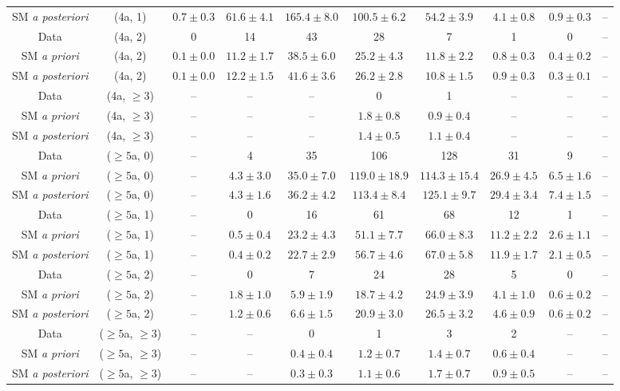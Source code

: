\begin{table}[h!]
{\begin{tabular}{cccccccccc}
	SM \textit{a posteriori} & (4a, 1) & $0.7\pm 0.3$ & $61.6\pm 4.1$ & $165.4\pm 8.0$ & $100.5\pm 6.2$ & $54.2\pm 3.9$ & $4.1\pm 0.8$ & $0.9\pm 0.3$ & -- \\[0.5ex] 
	Data & (4a, 2) & 0 & 14 & 43 & 28 & 7 & 1 & 0 & -- \\[0.5ex] 
	SM \textit{a priori} & (4a, 2) & $0.1\pm 0.0$ & $11.2\pm 1.7$ & $38.5\pm 6.0$ & $25.2\pm 4.3$ & $11.8\pm 2.2$ & $0.8\pm 0.3$ & $0.4\pm 0.2$ & -- \\[0.5ex] 
	SM \textit{a posteriori} & (4a, 2) & $0.1\pm 0.0$ & $12.2\pm 1.5$ & $41.6\pm 3.6$ & $26.2\pm 2.8$ & $10.8\pm 1.5$ & $0.9\pm 0.3$ & $0.3\pm 0.1$ & -- \\[0.5ex] 
	Data & (4a, $\ge3$) & -- & -- & -- & 0 & 1 & -- & -- & -- \\[0.5ex] 
	SM \textit{a priori} & (4a, $\ge3$) & -- & -- & -- & $1.8\pm 0.8$ & $0.9\pm 0.4$ & -- & -- & -- \\[0.5ex] 
	SM \textit{a posteriori} & (4a, $\ge3$) & -- & -- & -- & $1.4\pm 0.5$ & $1.1\pm 0.4$ & -- & -- & -- \\[0.5ex] 
	Data & ($\ge5$a, 0) & -- & 4 & 35 & 106 & 128 & 31 & 9 & -- \\[0.5ex] 
	SM \textit{a priori} & ($\ge5$a, 0) & -- & $4.3\pm 3.0$ & $35.0\pm 7.0$ & $119.0\pm 18.9$ & $114.3\pm 15.4$ & $26.9\pm 4.5$ & $6.5\pm 1.6$ & -- \\[0.5ex] 
	SM \textit{a posteriori} & ($\ge5$a, 0) & -- & $4.3\pm 1.6$ & $36.2\pm 4.2$ & $113.4\pm 8.4$ & $125.1\pm 9.7$ & $29.4\pm 3.4$ & $7.4\pm 1.5$ & -- \\[0.5ex] 
	Data & ($\ge5$a, 1) & -- & 0 & 16 & 61 & 68 & 12 & 1 & -- \\[0.5ex] 
	SM \textit{a priori} & ($\ge5$a, 1) & -- & $0.5\pm 0.4$ & $23.2\pm 4.3$ & $51.1\pm 7.7$ & $66.0\pm 8.3$ & $11.2\pm 2.2$ & $2.6\pm 1.1$ & -- \\[0.5ex] 
	SM \textit{a posteriori} & ($\ge5$a, 1) & -- & $0.4\pm 0.2$ & $22.7\pm 2.9$ & $56.7\pm 4.6$ & $67.0\pm 5.8$ & $11.9\pm 1.7$ & $2.1\pm 0.5$ & -- \\[0.5ex] 
	Data & ($\ge5$a, 2) & -- & 0 & 7 & 24 & 28 & 5 & 0 & -- \\[0.5ex] 
	SM \textit{a priori} & ($\ge5$a, 2) & -- & $1.8\pm 1.0$ & $5.9\pm 1.9$ & $18.7\pm 4.2$ & $24.9\pm 3.9$ & $4.1\pm 1.0$ & $0.6\pm 0.2$ & -- \\[0.5ex] 
	SM \textit{a posteriori} & ($\ge5$a, 2) & -- & $1.2\pm 0.6$ & $6.6\pm 1.5$ & $20.9\pm 3.0$ & $26.5\pm 3.2$ & $4.6\pm 0.9$ & $0.6\pm 0.2$ & -- \\[0.5ex] 
	Data & ($\ge5$a, $\ge3$) & -- & -- & 0 & 1 & 3 & 2 & -- & -- \\[0.5ex] 
	SM \textit{a priori} & ($\ge5$a, $\ge3$) & -- & -- & $0.4\pm 0.4$ & $1.2\pm 0.7$ & $1.4\pm 0.7$ & $0.6\pm 0.4$ & -- & -- \\[0.5ex] 
	SM \textit{a posteriori} & ($\ge5$a, $\ge3$) & -- & -- & $0.3\pm 0.3$ & $1.1\pm 0.6$ & $1.7\pm 0.7$ & $0.9\pm 0.5$ & -- & -- \\[0.5ex] 
	\hline
	\hline
\end{tabular}}
\end{table}
